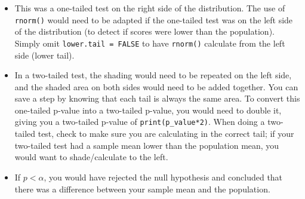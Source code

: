 \documentclass[
]{book}
\begin{document}
\begin{itemize}
\item
  This was a one-tailed test on the right side of the distribution. The use of \texttt{rnorm()} would need to be adapted if the one-tailed test was on the left side of the distribution (to detect if scores were lower than the population). Simply omit \texttt{lower.tail\ =\ FALSE} to have \texttt{rnorm()} calculate from the left side (lower tail).
\item
  In a two-tailed test, the shading would need to be repeated on the left side, and the shaded area on both sides would need to be added together. You can save a step by knowing that each tail is always the same area. To convert this one-tailed p-value into a two-tailed p-value, you would need to double it, giving you a two-tailed p-value of \texttt{print(p\_value*2)}. When doing a two-tailed test, check to make sure you are calculating in the correct tail; if your two-tailed test had a sample mean lower than the population mean, you would want to shade/calculate to the left.
\item
  If \(p < \alpha\), you would have rejected the null hypothesis and concluded that there was a difference between your sample mean and the population.
\end{itemize}

  
\end{document}
